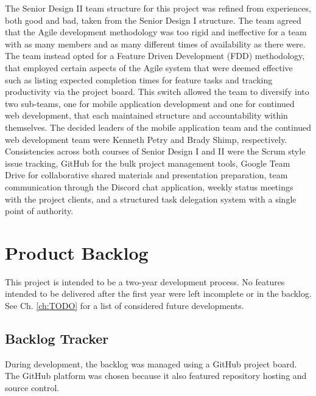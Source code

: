 The Senior Design II team structure for this project was refined from experiences, both good and bad, taken from the Senior Design I structure.  The team agreed that the Agile development methodology was too rigid and ineffective for a team with as many members and as many different times of availability as there were.  The team instead opted for a Feature Driven Development (FDD) methodology, that employed certain aspects of the Agile system that were deemed effective such as listing expected completion times for feature tasks and tracking productivity via the  project board. This switch allowed the team to diversify into two sub-teams, one for mobile application development and one for continued web development, that each maintained structure and accountability within themselves.  The decided leaders of the mobile application team and the continued web development team were Kenneth Petry and Brady Shimp, respectively.\\

Consistencies across both courses of Senior Design I and II were the Scrum style issue tracking, GitHub for the bulk project management tools, Google Team Drive for collaborative shared materials and presentation preparation, team communication through the Discord chat application, weekly status meetings with the project clients, and a structured task delegation system with a single point of authority.





\section{Product Backlog}

This project is intended to be a two-year development process. No features intended to be delivered after the first year were left incomplete or in the backlog. See Ch. \ref{ch:TODO} for a list of considered future developments. 

\subsection{Backlog Tracker}

During development, the backlog was managed using a GitHub project board. The GitHub platform was chosen because it also featured repository hosting and source control. 


